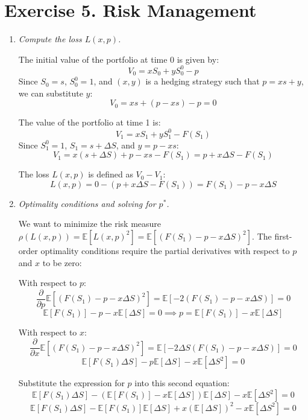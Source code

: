 \section{Exercise 5. Risk Management}

\begin{enumerate}
      \item \textsl{Compute the loss $L(x,p)$.}

            The initial value of the portfolio at time 0 is given by:
            \[ V_0 = xS_0 + yS^0_0 - p \]
            Since $S_0 = s$, $S^0_0 = 1$, and $(x, y)$ is a hedging strategy such that $p = xs + y$, we can substitute $y$:
            \[ V_0 = xs + (p - xs) - p = 0 \]

            The value of the portfolio at time 1 is:
            \[ V_1 = xS_1 + yS^0_1 - F(S_1) \]
            Since $S^0_1 = 1$, $S_1 = s + \Delta S$, and $y = p - xs$:
            \[ V_1 = x(s + \Delta S) + p - xs - F(S_1) = p + x\Delta S - F(S_1) \]

            The loss $L(x,p)$ is defined as $V_0 - V_1$:
            \[ L(x,p) = 0 - (p + x\Delta S - F(S_1)) = F(S_1) - p - x\Delta S \]

      \item \textsl{Optimality conditions and solving for $p^*$.}

            We want to minimize the risk measure $\rho(L(x,p)) = \mathbb{E}[L(x,p)^2] = \mathbb{E}[(F(S_1) - p - x\Delta S)^2]$.
            The first-order optimality conditions require the partial derivatives with respect to $p$ and $x$ to be zero:

            With respect to $p$:
            \[ \frac{\partial}{\partial p} \mathbb{E}[(F(S_1) - p - x\Delta S)^2] = \mathbb{E}[-2(F(S_1) - p - x\Delta S)] = 0 \]
            \[ \mathbb{E}[F(S_1)] - p - x\mathbb{E}[\Delta S] = 0 \implies p = \mathbb{E}[F(S_1)] - x\mathbb{E}[\Delta S] \]

            With respect to $x$:
            \[ \frac{\partial}{\partial x} \mathbb{E}[(F(S_1) - p - x\Delta S)^2] = \mathbb{E}[-2\Delta S(F(S_1) - p - x\Delta S)] = 0 \]
            \[ \mathbb{E}[F(S_1)\Delta S] - p\mathbb{E}[\Delta S] - x\mathbb{E}[\Delta S^2] = 0 \]

            Substitute the expression for $p$ into this second equation:
            \[ \mathbb{E}[F(S_1)\Delta S] - (\mathbb{E}[F(S_1)] - x\mathbb{E}[\Delta S])\mathbb{E}[\Delta S] - x\mathbb{E}[\Delta S^2] = 0 \]
            \[ \mathbb{E}[F(S_1)\Delta S] - \mathbb{E}[F(S_1)]\mathbb{E}[\Delta S] + x(\mathbb{E}[\Delta S])^2 - x\mathbb{E}[\Delta S^2] = 0 \]


\end{enumerate}
